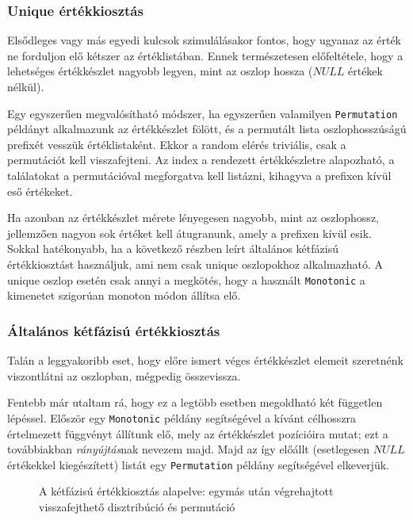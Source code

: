 \documentclass[
    parspace,
    noindent,
    nohyp,
]{elteiktdk}[2023/04/10]
\begin{document}
\subsubsection{Unique értékkiosztás}

Elsődleges vagy más egyedi kulcsok szimulálásakor fontos,
hogy ugyanaz az érték ne forduljon elő kétszer az értéklistában.
Ennek természetesen előfeltétele,
hogy a lehetséges értékkészlet nagyobb legyen, mint az oszlop hossza
($NULL$ értékek nélkül).

Egy egyszerűen megvalósítható módszer,
ha egyszerűen valamilyen \texttt{Permutation} példányt alkalmazunk az értékkészlet fölött,
és a permutált lista oszlophosszúságú prefixét vesszük értéklistaként.
Ekkor a random elérés triviális, csak a permutációt kell visszafejteni.
Az index a rendezett értékkészletre alapozható,
a találatokat a permutációval megforgatva kell listázni,
kihagyva a prefixen kívül eső értékeket.

Ha azonban az értékkészlet mérete lényegesen nagyobb, mint az oszlophossz,
jellemzően nagyon sok értéket kell átugranunk, amely a prefixen kívül esik.
Sokkal hatékonyabb, ha a következő részben leírt általános kétfázisú értékkiosztást használjuk,
ami nem csak unique oszlopokhoz alkalmazható.
A unique oszlop esetén csak annyi a megkötés, hogy a használt \texttt{Monotonic}
a kimenetet szigorúan monoton módon állítsa elő.

\subsubsection{Általános kétfázisú értékkiosztás}

Talán a leggyakoribb eset,
hogy előre ismert véges értékkészlet elemeit szeretnénk viszontlátni az oszlopban,
mégpedig összevissza.

Fentebb már utaltam rá, hogy ez a legtöbb esetben megoldható két független lépéssel.
Először egy \texttt{Monotonic} példány segítségével a kívánt célhosszra
értelmezett függvényt állítunk elő, mely az értékkészlet pozícióira mutat;
ezt a továbbiakban \textit{rányújtás}nak nevezem majd.
Majd az így előállt (esetlegesen $NULL$ értékekkel kiegészített) listát
egy \texttt{Permutation} példány segítségével elkeverjük.

\begin{figure}[H]
\centering

\caption{A kétfázisú értékkiosztás alapelve: egymás után végrehajtott visszafejthető disztribúció és permutáció}
\label{A kétfázisú értékkiosztás alapelve}
\end{figure}
\end{document}
